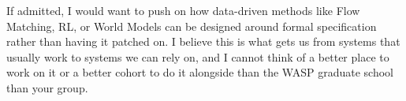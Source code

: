 \documentclass{article}
\begin{document}
If admitted, I would want to push on how data-driven methods like Flow Matching, RL, or World Models can be designed around formal specification rather than having it patched on. I believe this is what gets us from systems that usually work to systems we can rely on, and I cannot think of a better place to work on it or a better cohort to do it alongside than the WASP graduate school than your group.

 
 
 
 
 
\end{document}
